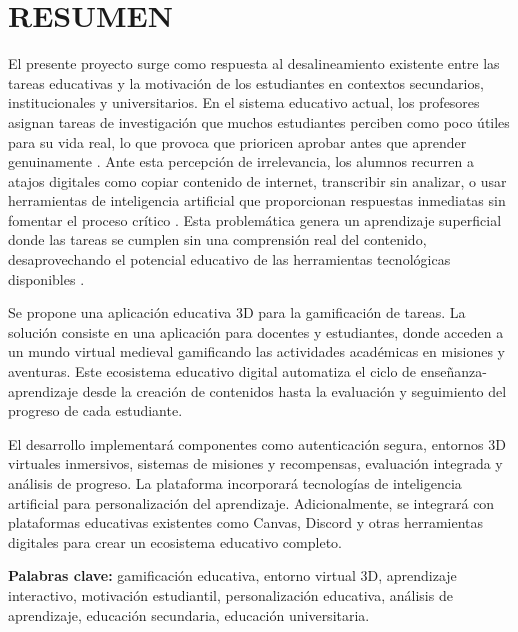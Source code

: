\section{RESUMEN}

El presente proyecto surge como respuesta al desalineamiento existente entre las tareas educativas y la motivación de los estudiantes en contextos secundarios, institucionales y universitarios. En el sistema educativo actual, los profesores asignan tareas de investigación que muchos estudiantes perciben como poco útiles para su vida real, lo que provoca que prioricen aprobar antes que aprender genuinamente \cite{deci2017}. Ante esta percepción de irrelevancia, los alumnos recurren a atajos digitales como copiar contenido de internet, transcribir sin analizar, o usar herramientas de inteligencia artificial que proporcionan respuestas inmediatas sin fomentar el proceso crítico \cite{chen2023}. Esta problemática genera un aprendizaje superficial donde las tareas se cumplen sin una comprensión real del contenido, desaprovechando el potencial educativo de las herramientas tecnológicas disponibles \cite{martinez2023}.

Se propone una aplicación educativa 3D para la gamificación de tareas. La solución consiste en una aplicación para docentes y estudiantes, donde acceden a un mundo virtual medieval gamificando las actividades académicas en misiones y aventuras. Este ecosistema educativo digital automatiza el ciclo de enseñanza-aprendizaje desde la creación de contenidos hasta la evaluación y seguimiento del progreso de cada estudiante.

El desarrollo implementará componentes como autenticación segura, entornos 3D virtuales inmersivos, sistemas de misiones y recompensas, evaluación integrada y análisis de progreso. La plataforma incorporará tecnologías de inteligencia artificial para personalización del aprendizaje. Adicionalmente, se integrará con plataformas educativas existentes como Canvas, Discord y otras herramientas digitales para crear un ecosistema educativo completo.

\textbf{Palabras clave:} gamificación educativa, entorno virtual 3D, aprendizaje interactivo, motivación estudiantil, personalización educativa, análisis de aprendizaje, educación secundaria, educación universitaria.
